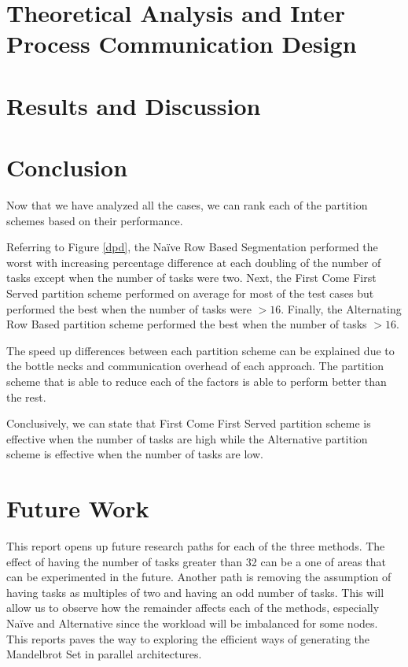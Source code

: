 \documentclass[conference]{IEEEtran}
\begin{document}
	\section{Theoretical  Analysis and Inter Process Communication Design}



	\section{Results and Discussion}	
	
	
	
	

	\section{Conclusion}
	Now that we have analyzed all the cases, we can rank each of the partition schemes based on their performance. 
	
	Referring to Figure \ref{dpd}, the Naïve Row Based Segmentation performed the worst with increasing percentage difference at each doubling of the number of tasks except when the number of tasks were two. Next, the First Come First Served partition scheme performed on average for most of the test cases but performed the best when the number of tasks were $ > 16$. Finally, the Alternating Row Based partition scheme performed the best when the number of tasks $ > 16$. 
	
	The speed up differences between each partition scheme can be explained due to the bottle necks and communication overhead of each approach. The partition scheme that is able to reduce each of the factors is able to perform better than the rest.
	
	Conclusively, we can state that First Come First Served partition scheme is effective when the number of tasks are high while the Alternative partition scheme is effective when the number of tasks are low.
	
	\section{Future Work}
	This report opens up future research paths for each of the three methods. The effect of having the number of tasks greater than 32 can be a one of areas that can be experimented in the future. Another path is removing the assumption of having tasks as multiples of two and having an odd number of tasks. This will allow us to observe how the remainder affects each of the methods, especially Naïve and Alternative since the workload will be imbalanced for some nodes. 
	This reports paves the way to exploring the efficient ways of generating the Mandelbrot Set in parallel architectures.
	

	



	\newpage
	\onecolumn
	\appendix
\end{document}
